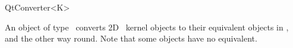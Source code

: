 \begin{ccRefClass}[Qt::]{QtConverter<K>}

\ccDefinition
An object of type \ccRefName\ converts 2D \cgal\ kernel objects to their equivalent 
objects in \qt, and the other way round. Note that some objects have no equivalent.



\ccOperations


\end{ccRefClass}







